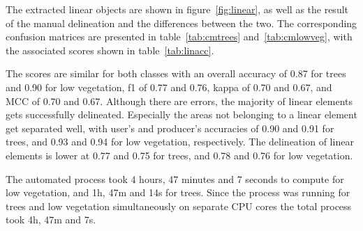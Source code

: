 The extracted linear objects are shown in figure~\ref{fig:linear}, as well as the result of the manual delineation and the differences between the two. The corresponding confusion matrices are presented in table~\ref{tab:cmtrees} and~\ref{tab:cmlowveg}, with the associated scores shown in table~\ref{tab:linacc}.

The scores are similar for both classes with an overall accuracy of 0.87 for trees and 0.90 for low vegetation, f1 of 0.77 and 0.76, kappa of 0.70 and 0.67, and MCC of 0.70 and 0.67. Although there are errors, the majority of linear elements gets successfully delineated. Especially the areas not belonging to a linear element get separated well, with user's and producer's accuracies of 0.90 and 0.91 for trees, and 0.93 and 0.94 for low vegetation, respectively. The delineation of linear elements is lower at 0.77 and 0.75 for trees, and 0.78 and 0.76 for low vegetation.

The automated process took 4 hours, 47 minutes and 7 seconds to compute for low vegetation, and 1h, 47m and 14s for trees. Since the process was running for trees and low vegetation simultaneously on separate CPU cores the total process took 4h, 47m and 7s.

